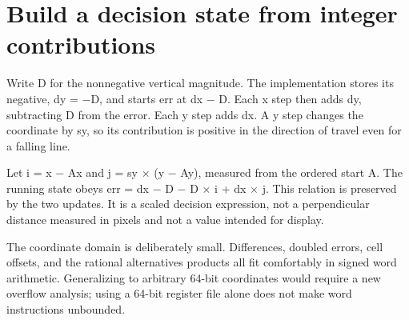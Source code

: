 \section{Build a decision state from integer
  contributions}\label{007-bresenham-line-p04-build-a-decision-state-from-integer-contributions}

Write D for the nonnegative vertical magnitude. The implementation
stores its negative, dy = \ensuremath{-}D, and starts err at dx \ensuremath{-} D. Each x step then
adds dy, subtracting D from the error. Each y step adds dx. A y step
changes the coordinate by sy, so its contribution is positive in the
direction of travel even for a falling line.

Let i = x \ensuremath{-} Ax and j = sy \ensuremath{\times} (y \ensuremath{-} Ay), measured from the ordered start A.
The running state obeys err = dx \ensuremath{-} D \ensuremath{-} D \ensuremath{\times} i + dx \ensuremath{\times} j. This relation is
preserved by the two updates. It is a scaled decision expression, not a
perpendicular distance measured in pixels and not a value intended for
display.

The coordinate domain is deliberately small. Differences, doubled
errors, cell offsets, and the rational alternative\textquotesingle s
products all fit comfortably in signed word arithmetic. Generalizing to
arbitrary 64-bit coordinates would require a new overflow analysis;
using a 64-bit register file alone does not make word instructions
unbounded.
